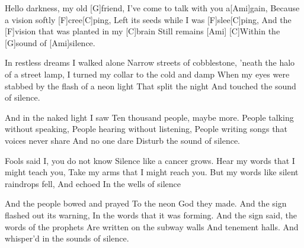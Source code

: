 
\sloka
[Ami]Hello darkness, my old [G]friend,
I've come to talk with you a[Ami]gain,
Because a vision softly [F]cree[C]ping,
Left its seeds while I was [F]slee[C]ping,
And the [F]vision that was planted in my [C]brain
Still remains [Ami]
[C]Within the [G]sound of [Ami]silence.

\sloka
In restless dreams I walked alone
Narrow streets of cobblestone,
'neath the halo of a street lamp,
I turned my collar to the cold and damp
When my eyes were stabbed by the flash of a neon light
That split the night
And touched the sound of silence.

\sloka
And in the naked light I saw
Ten thousand people, maybe more.
People talking without speaking,
People hearing without listening,
People writing songs that voices never share
And no one dare
Disturb the sound of silence.

\sloka
Fools said I, you do not know
Silence like a cancer grows.
Hear my words that I might teach you,
Take my arms that I might reach you.
But my words like silent raindrops fell,
And echoed
In the wells of silence

\sloka
And the people bowed and prayed
To the neon God they made.
And the sign flashed out its warning,
In the words that it was forming.
And the sign said, the words of the prophets
Are written on the subway walls
And tenement halls.
And whisper'd in the sounds of silence.
